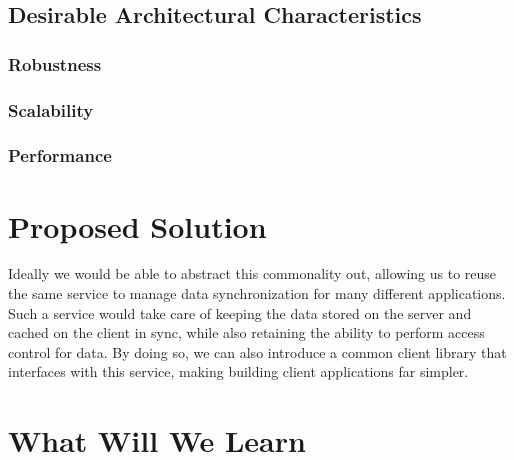 \documentclass[12pt]{article}
\begin{document}
        \subsection{Desirable Architectural Characteristics}
            \subsubsection{Robustness}
            \subsubsection{Scalability}
            \subsubsection{Performance}

    \section{Proposed Solution}
    Ideally we would be able to abstract this commonality out, allowing us to reuse the same service to manage data synchronization for many different applications.
    Such a service would take care of keeping the data stored on the server and cached on the client in sync, while also retaining the ability to perform access control for data.
    By doing so, we can also introduce a common client library that interfaces with this service, making building client applications far simpler.

    \section{What Will We Learn}
\end{document}
